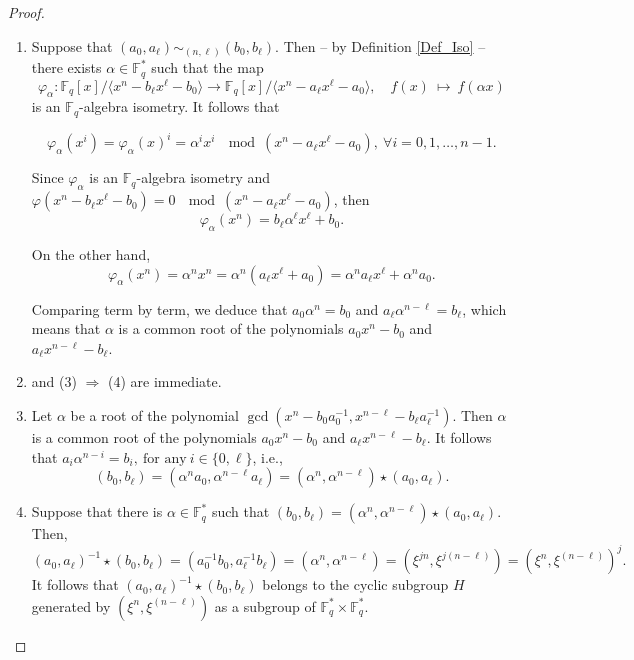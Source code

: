 \documentclass[12pt]{elsarticle}
\newcommand{\Fq}{\mathbb{F}_{q}}
\theoremstyle{break}
{\theorembodyfont{\upshape}
    \newtheorem{theorem}{Theorem}[section] %
    \newtheorem{lemma}[theorem]{Lemma} %
    \newtheorem{proposition}[theorem]{Proposition}
    \newtheorem{corollary}[theorem]{Corollary}
    \newtheorem{definition}[theorem]{Definition}
    \newtheorem{example}[theorem]{Example}
    \newtheorem{remark}[theorem]{Remark}
    \newtheorem{conjecture}[theorem]{Conjecture}
    \newtheorem*{proof}{{Proof}}
	\newtheorem*{notation}{Notation}
	\newtheorem*{main}{Cain Theorem}
	\newtheorem*{problem}{Problem}
}
\begin{document}
\begin{proof}
\begin{enumerate}
    \item[(1) $\Rightarrow$ (2)] 
    Suppose that $(a_0, a_{\ell}) \sim_{(n,\ell)} (b_0, b_{\ell})$. Then -- by Definition \ref{Def_Iso} -- there exists $\alpha \in \mathbb{F}_q^*$ such that the map
    $$
    \varphi_{\alpha} : \mathbb{F}_q[x] /\langle x^n - b_{\ell} x^{\ell} - b_0 \rangle \to \mathbb{F}_q[x] /\langle x^n - a_{\ell} x^{\ell} - a_0 \rangle, \quad f(x) \ \mapsto \ f(\alpha x)
    $$
    is an $\mathbb{F}_q$-algebra isometry. It follows that

    $$
    \varphi_{\alpha}(x^i) = \varphi_{\alpha}(x)^i = \alpha^i x^i \ \mod (x^n - a_{\ell} x^{\ell} - a_0), \ \forall i = 0, 1, \ldots, n-1.
    $$

    Since $\varphi_{\alpha}$ is an $\mathbb{F}_q$-algebra isometry and $\varphi(x^n - b_{\ell} x^{\ell} - b_0) = 0 \ \mod (x^n - a_{\ell} x^{\ell} - a_0)$, then
    \begin{equation}
    \varphi_{\alpha}(x^n) = b_{\ell} \alpha^{\ell} x^{\ell} + b_0.
    \end{equation}

    On the other hand,
    \begin{equation}
    \varphi_{\alpha}(x^n) = \alpha^n x^n = \alpha^n (a_{\ell} x^{\ell} + a_0) = \alpha^n a_{\ell} x^{\ell} + \alpha^n a_0.
    \end{equation}

    Comparing term by term, we deduce that $a_0 \alpha^n = b_0$ and $a_{\ell} \alpha^{n-\ell} = b_{\ell}$, which means that $\alpha$ is a common root of the polynomials $a_0 x^n - b_0$ and $a_{\ell} x^{n-\ell} - b_{\ell}$.

    \item[(2) $\Rightarrow$ (3)] and (3) $\Rightarrow$ (4) are immediate.
    \item[(4) $\Rightarrow$ (5)]
    Let $\alpha $ be a root of the polynomial $\gcd(x^{n} - b_0 a_0^{-1}, x^{n-\ell} - b_{\ell} a_{\ell}^{-1})$. Then $\alpha$ is a common root of the polynomials $a_0 x^n - b_0$ and $a_{\ell} x^{n-\ell} - b_{\ell}$. It follows that  $a_i \alpha^{n-i}= b_i,\ \text{for any} \ i\in \{ 0,\ell\}$, i.e.,
$$  (b_0, b_{\ell} )= (\alpha^n a_0, \alpha^{n-\ell} a_{\ell})=(\alpha^n, \alpha^{n-\ell})\star(a_0, a_{\ell} ).$$ 
 \item[(5) $\Rightarrow$ (6)]
Suppose that there is $\alpha\in \Fq^*$ such that $ (b_0, b_{\ell} ) =(\alpha^n, \alpha^{n-\ell})\star(a_0, a_{\ell} ). $ Then,  
$$  (a_0,a_{\ell})^{-1}\star(b_0, b_{\ell})= (a_0^{-1}b_0, a_{\ell}^{-1}b_{\ell} ) = (\alpha^{n}, \alpha^{n-\ell} )= (\xi^{j n}, \xi^{ j(n-\ell)} )= (\xi^{n}, \xi^{(n-\ell)})^j .$$
It follows that  $ (a_0,a_{\ell})^{-1}\star(b_0, b_{\ell}) $ belongs to the cyclic subgroup  $H$ generated by $  (\xi^{n}, \xi^{(n-\ell)}) $  as a subgroup of $ \Fq^{*}\times \Fq^{*}.$



\end{enumerate}
\end{proof}
\end{document}
